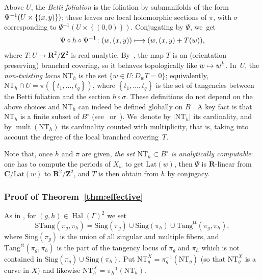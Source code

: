 \documentclass[JEP,XML,SOM,Unicode,published]{cedram}
\newcommand\mto{\mathchoice{\longmapsto}{\mapsto}{\mapsto}{\mapsto}}
\let\sep :
\newcommand{\set}[1]{\left\{#1\right\}}
\newcommand{\abs}[1]{\left\vert#1\right\vert}
\newcommand{\inv}{^{-1}}
\DeclareMathOperator{\mult}{mult}
\DeclareMathOperator{\Hal}{Hal}
\def\C{\mathbf{C}}
\def\R{\mathbf{R}}
\def\Z{\mathbf{Z}}
\newcommand{\Lat}{{\mathrm{Lat}}}
\newcommand{\Sing}{{\mathrm{Sing}}}
\newcommand{\Tang}{{\mathrm{Tang}}}
\newcommand{\STang}{{\mathrm{STang}}}
\newcommand{\NT}{{\mathrm{NT}}}
\theoremstyle{plain}
\theoremstyle{definition}
\begin{document}
Above $U$, the \emph{Betti foliation} is the foliation by
submanifolds of the form $\Psi\inv(U\times\nobreak \set{(x,y)})$; these leaves are local holomorphic sections of $\pi$, with $\sigma$ corresponding to $\Psi\inv(U\times \set{(0,0)})$.
Conjugating by
$\Psi$, we~get
\begin{equation}\label{eq:definition_T}
\Psi\circ h\circ \Psi^{-1}\colon (w, (x,y))\mto (w, (x,y)+T(w)),
\end{equation}
where $T\colon U\to \R^2/\Z^2$ is real analytic. By~\cite[Lem.\,3.9]{invariant}, the map $T$
is an (orientation preserving)
branched covering, so it behaves topologically like $w\mto w^k$. In~$U$, the
\emph{non-twisting locus} $\mathrm{NT}_{h}$
is the set $\{w\in U\sep  D_wT = 0\}$; equivalently, $\mathrm{NT}_{h }\cap U = \pi(\set{t_1, \ldots , t_q})$, where
$\set{t_1, \ldots , t_q}$ is the set of tangencies between
the Betti foliation and the section $h \circ \sigma$. These definitions do not depend on the above choices and $\mathrm{NT}_{h}$ can indeed be defined globally on $B^\circ$.
A key fact is that $\mathrm{NT}_{h}$ is a finite subset of $B^\circ$
(see~\cite[Prop.\,3.14]{invariant} or~\cite[Cor.\,7.7.10]{duistermaat}). We~denote by $\abs{\NT_h}$ its cardinality, and by $\mult(\NT_h)$
its cardinality counted with multiplicity, that is, taking into account the
degree of the local branched covering~$T$.

Note that, once $h$ and $\pi$ are given, {\textit{the set $\NT_h\subset B^\circ$ is analytically computable}}: one has to compute the periods of $X_w$
to get $\Lat(w)$, then $\Psi$ is $\R$-linear from $\C/\Lat(w)$ to $\R^2/\Z^2$, and $T$ is then obtain from $h$ by conjugacy.

\subsubsection{Proof of Theorem~\ref{thm:effective}}
As in \cite{invariant}, for $(g,h)\in \Hal(\Gamma)^2$
we set
\begin{equation*}
\STang(\pi_g, \pi_h) =
\Sing(\pi_g)\cup\Sing (\pi_h)\cup \Tang^{\mathrm{tt}}(\pi_g, \pi_h),
\end{equation*}
where $\Sing(\pi_g)$ is the union of all singular and multiple fibers, and
$\Tang^{\mathrm{tt}}(\pi_g, \pi_h)$ is the part of the tangency locus of $\pi_g$ and $\pi_h$ which is not contained in $\Sing(\pi_g)\cup\Sing (\pi_h)$.
Put $\NT_g^X=\pi_g^{-1}(\NT_g)$ (so that $\NT_g^X$ is a curve in $X$) and
likewise $\NT_h^X=\pi_h^{-1}(\NT_h)$.
\end{document}
